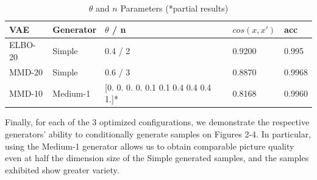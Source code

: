 \documentclass{article}
\begin{document}
\begin{table}[h]
  \caption{$\theta$ and $n$ Parameters (*partial results)}
  \label{theta}
  \centering
  \begin{tabular}{lllll}
    \toprule
    VAE     & Generator     & $\theta$ / n & $cos(x,x')$ & acc \\
    \midrule
    ELBO-20 & Simple  & 0.4 / 2 & 0.9200 & 0.995 \\
    MMD-20 & Simple &  0.6 / 3  & 0.8870 & 0.9968 \\
    MMD-10 & Medium-1 & [0.  0.  0.  0.  0.1 0.1 0.4 0.4 0.4 1.]* & 0.8168 & 0.9960 \\
    \bottomrule
  \end{tabular}
\end{table}

Finally, for each of the 3 optimized configurations, we demonstrate the respective generators' ability to conditionally generate samples on Figures 2-4. In particular, using the Medium-1 generator allows us to obtain comparable picture quality even at half the dimension size of the Simple generated samples, and the samples exhibited show greater variety.
\end{document}
